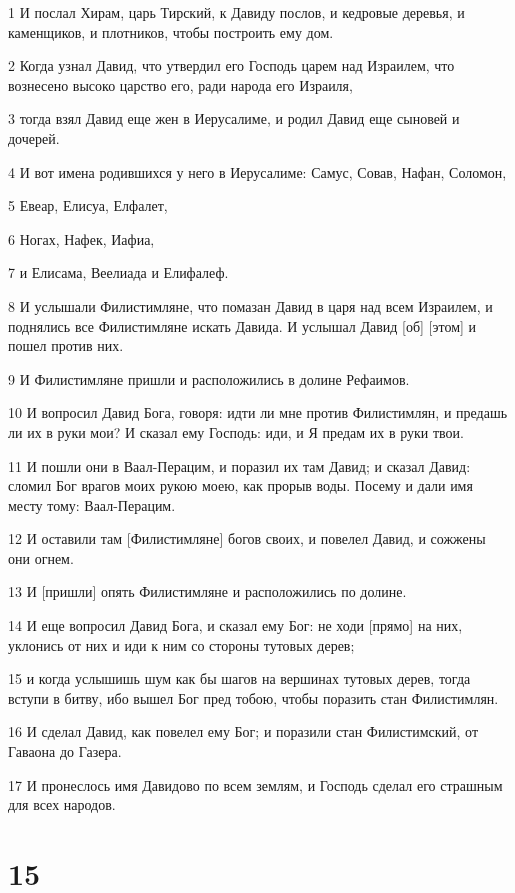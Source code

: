 \par 1 И послал Хирам, царь Тирский, к Давиду послов, и кедровые деревья, и каменщиков, и плотников, чтобы построить ему дом.
\par 2 Когда узнал Давид, что утвердил его Господь царем над Израилем, что вознесено высоко царство его, ради народа его Израиля,
\par 3 тогда взял Давид еще жен в Иерусалиме, и родил Давид еще сыновей и дочерей.
\par 4 И вот имена родившихся у него в Иерусалиме: Самус, Совав, Нафан, Соломон,
\par 5 Евеар, Елисуа, Елфалет,
\par 6 Ногах, Нафек, Иафиа,
\par 7 и Елисама, Веелиада и Елифалеф.
\par 8 И услышали Филистимляне, что помазан Давид в царя над всем Израилем, и поднялись все Филистимляне искать Давида. И услышал Давид [об] [этом] и пошел против них.
\par 9 И Филистимляне пришли и расположились в долине Рефаимов.
\par 10 И вопросил Давид Бога, говоря: идти ли мне против Филистимлян, и предашь ли их в руки мои? И сказал ему Господь: иди, и Я предам их в руки твои.
\par 11 И пошли они в Ваал-Перацим, и поразил их там Давид; и сказал Давид: сломил Бог врагов моих рукою моею, как прорыв воды. Посему и дали имя месту тому: Ваал-Перацим.
\par 12 И оставили там [Филистимляне] богов своих, и повелел Давид, и сожжены они огнем.
\par 13 И [пришли] опять Филистимляне и расположились по долине.
\par 14 И еще вопросил Давид Бога, и сказал ему Бог: не ходи [прямо] на них, уклонись от них и иди к ним со стороны тутовых дерев;
\par 15 и когда услышишь шум как бы шагов на вершинах тутовых дерев, тогда вступи в битву, ибо вышел Бог пред тобою, чтобы поразить стан Филистимлян.
\par 16 И сделал Давид, как повелел ему Бог; и поразили стан Филистимский, от Гаваона до Газера.
\par 17 И пронеслось имя Давидово по всем землям, и Господь сделал его страшным для всех народов.

\chapter{15}


